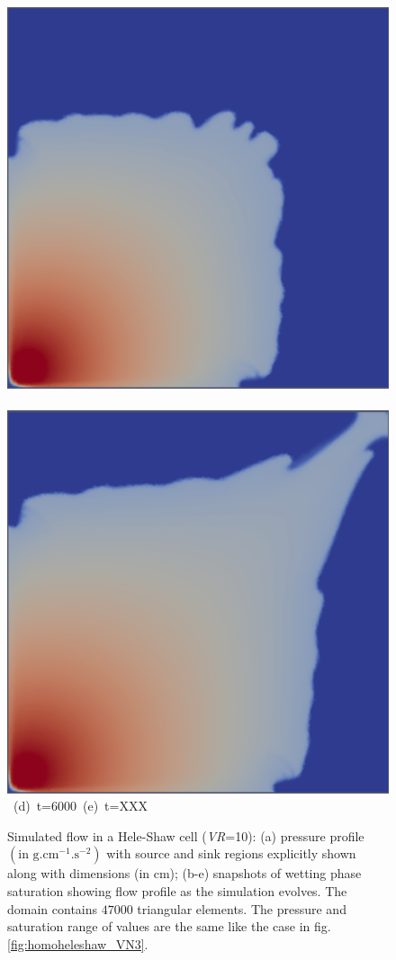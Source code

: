 \begin{landscape}
\begin{figure}[ht]
{\vspace{0.5cm}
\hbox{
      \includegraphics[width=.5\textwidth]{./Pics1/Saffman_homogeneous/saffman_homo_fixed_6000.pdf}
      \includegraphics[width=.5\textwidth]{./Pics1/Saffman_homogeneous/saffman_homo_fixed_end_1.pdf}}
\vspace{0.cm}
\hbox{ \hspace{2.cm} (d) t=6000 \hspace{3.cm} (e) t=XXX}
\vspace{0.cm}
}   
\caption{Simulated flow in a Hele-Shaw cell ({\it VR}=10): (a) pressure profile $\left(\text{in g.cm}^{-1}\text{.s}^{-2}\right)$ with source and sink regions explicitly shown along with dimensions (in cm); (b-e) snapshots of wetting phase saturation showing flow profile as the simulation evolves. The domain contains $47000$  triangular elements. The pressure and saturation range of values are the same like the  case in fig.\ref{fig:homoheleshaw_VN3}.}
\label{fig:homoheleshaw_VN10}
\end{figure}
\end{landscape}
\clearpage



